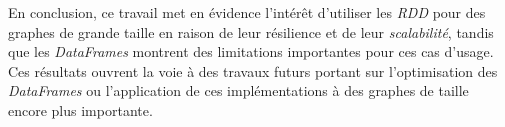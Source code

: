 \documentclass[conference]{IEEEtran}
\begin{document}
En conclusion, ce travail met en évidence l'intérêt d'utiliser les \textit{RDD} pour des graphes de grande taille en raison de leur résilience et de leur \textit{scalabilité}, tandis que les \textit{DataFrames} montrent des limitations importantes pour ces cas d'usage. Ces résultats ouvrent la voie à des travaux futurs portant sur l'optimisation des \textit{DataFrames} ou l'application de ces implémentations à des graphes de taille encore plus importante.



\balance %
\end{document}
